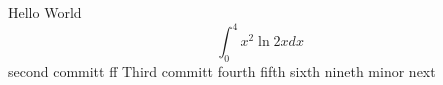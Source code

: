 \documentclass{article}
\begin{document}
Hello World
$$\int_0^4 x^2 \ln{2x}dx$$
second committ  ff
Third committ 
fourth
fifth
sixth
nineth
minor
next
\end{document}
